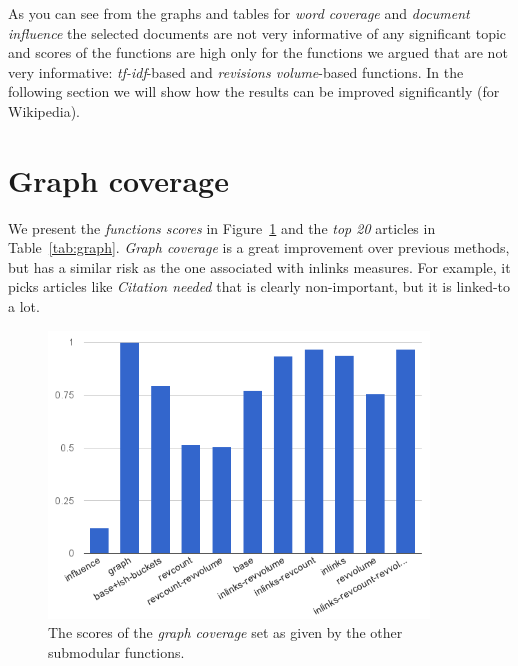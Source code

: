 As you can see from the graphs and tables for \emph{word coverage} and
\emph{document influence} the selected documents are not very informative of
any significant topic and scores of the functions are high only for the
functions we argued that are not very informative: \emph{tf-idf}-based and
\emph{revisions volume}-based functions.
In the following section we will show how the results can be improved
significantly (for Wikipedia).

\section{Graph coverage}

We present the \emph{functions scores} in Figure~\ref{img:graph} and the
\emph{top 20} articles in Table~\ref{tab:graph}.
\emph{Graph coverage} is a great improvement over previous methods, but has a
similar risk as the one associated with inlinks measures. For example, it picks
articles like \emph{Citation needed} that is clearly non-important, but it is
linked-to a lot.

\begin{figure}
  \centering
  \includegraphics[width=0.9\textwidth,natwidth=555,natheight=419]{images/graph.png}
  \caption{The scores of the \emph{graph coverage} set as given by the other
  submodular functions.}
  \label{img:graph}
\end{figure}

